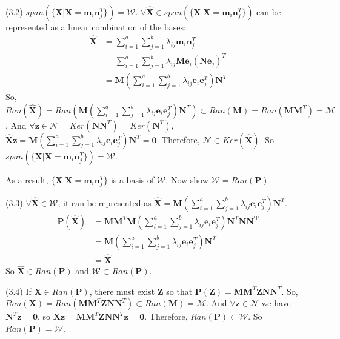 \documentclass[22pt]{article}
\begin{document}
		\quad (3.2) $span(\{\mathbf{X}|\mathbf{X} = \mathbf{m}_i\mathbf{n}_j^T\}) = \mathcal{W}$. $\forall \hat{\mathbf{X}} \in span(\{\mathbf{X}|\mathbf{X} = \mathbf{m}_i\mathbf{n}_j^T\})  $ can be represented as a linear combination of the bases: 
		\begin{align}	
		\hat{\mathbf{X}} & = \sum\limits_{i=1}^a\sum\limits_{j=1}^b \lambda_{ij}\mathbf{m}_i\mathbf{n}_j^T\\
		& =  \sum\limits_{i=1}^a\sum\limits_{j=1}^b \lambda_{ij}\mathbf{Me}_i(\mathbf{Ne}_j)^T\\
		& = \mathbf{M}(\sum\limits_{i=1}^a\sum\limits_{j=1}^b \lambda_{ij}\mathbf{e}_i\mathbf{e}_j^T)\mathbf{N}^T
		\end{align}
		So, $Ran(\hat{\mathbf{X}}) = Ran(\mathbf{M}(\sum\limits_{i=1}^a\sum\limits_{j=1}^b \lambda_{ij}\mathbf{e}_i\mathbf{e}_j^T)\mathbf{N}^T) \subset Ran(\mathbf{M})= Ran(\mathbf{MM}^T) = \mathcal{M}$. And $\forall \mathbf{z} \in \mathcal{N} = Ker(\mathbf{NN}^T) = Ker(\mathbf{N}^T)$, $\hat{\mathbf{X}}\mathbf{z} = \mathbf{M}(\sum\limits_{i=1}^a\sum\limits_{j=1}^b \lambda_{ij}\mathbf{e}_i\mathbf{e}_j^T)\mathbf{N}^T=\mathbf{0}$. Therefore, $\mathcal{N}\subset Ker(\hat{\mathbf{X}}) $. So $span(\{\mathbf{X}|\mathbf{X} = \mathbf{m}_i\mathbf{n}_j^T\}) = \mathcal{W}$.

	As a result, $\{\mathbf{X}|\mathbf{X} = \mathbf{m}_i\mathbf{n}_j^T \}$ is a basis of $\mathcal{W}$. Now show $\mathcal{W} =  Ran(\mathbf{P})$.

	(3.3) $\forall \hat{\mathbf{X}} \in \mathcal{W}$, it can be represented as $\hat{\mathbf{X}} = \mathbf{M}(\sum\limits_{i=1}^a\sum\limits_{j=1}^b \lambda_{ij}\mathbf{e}_i\mathbf{e}_j^T)\mathbf{N}^T $.
	\begin{align}
		\mathbf{P(\hat{\mathbf{X}})} & =  \mathbf{MM}^T\mathbf{M}(\sum\limits_{i=1}^a\sum\limits_{j=1}^b \lambda_{ij}\mathbf{e}_i\mathbf{e}_j^T)\mathbf{N}^T\mathbf{NN^T}\\
		& = \mathbf{M}(\sum\limits_{i=1}^a\sum\limits_{j=1}^b \lambda_{ij}\mathbf{e}_i\mathbf{e}_j^T)\mathbf{N}^T\\
		& = \hat{\mathbf{X}}
	\end{align}
	So $\hat{\mathbf{X}} \in Ran(\mathbf{P})$ and $\mathcal{W} \subset Ran(\mathbf{P})$.

	(3.4) If $\mathbf{X} \in  Ran(\mathbf{P})$, there must exist $\mathbf{Z}$ so that $\mathbf{P(Z)} = \mathbf{MM}^T\mathbf{ZNN}^T$. So, $Ran(\mathbf{X}) = Ran(\mathbf{MM}^T\mathbf{ZNN}^T)\subset Ran(\mathbf{M}) = \mathcal{M}$. And $\forall \mathbf{z} \in \mathcal{N}$ we have $\mathbf{N}^T\mathbf{z} = \mathbf{0}$, so $\mathbf{Xz} = \mathbf{MM}^T\mathbf{ZNN}^T\mathbf{z} = \mathbf{0}$. Therefore, $Ran(\mathbf{P}) \subset \mathcal{W}$. So $Ran(\mathbf{P}) =\mathcal{W}$.
\end{document}

